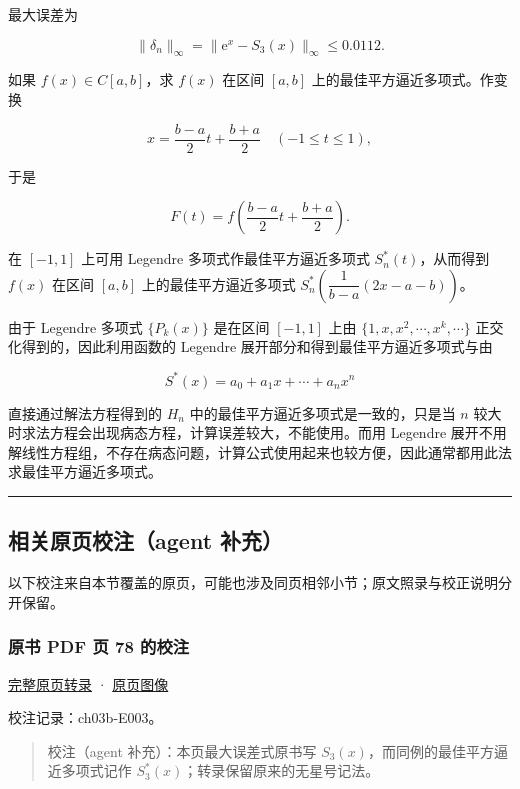 \documentclass[
  10pt,
  fontset=fandol]{ctexart}
\begin{document}
最大误差为

\[
\|\delta_n\|_\infty=\|\mathrm e^x-S_3(x)\|_\infty\leqslant0.0112.
\]

如果 \(f(x)\in C[a,b]\)，求 \(f(x)\) 在区间 \([a,b]\) 上的最佳平方逼近多项式。作变换

\[
x=\frac{b-a}{2}t+\frac{b+a}{2}\quad(-1\leqslant t\leqslant1),
\]

于是

\[
F(t)=f\left(\frac{b-a}{2}t+\frac{b+a}{2}\right).
\]

在 \([-1,1]\) 上可用 Legendre 多项式作最佳平方逼近多项式 \(S_n^*(t)\)，从而得到 \(f(x)\) 在区间 \([a,b]\) 上的最佳平方逼近多项式 \(S_n^*\left(\dfrac1{b-a}(2x-a-b)\right)\)。

由于 Legendre 多项式 \(\{P_k(x)\}\) 是在区间 \([-1,1]\) 上由 \(\{1,\allowbreak x,\allowbreak x^2,\allowbreak \cdots,\allowbreak x^k,\allowbreak \cdots\}\) 正交化得到的，因此利用函数的 Legendre 展开部分和得到最佳平方逼近多项式与由

\[
S^*(x)=a_0+a_1x+\cdots+a_nx^n
\]

直接通过解法方程得到的 \(H_n\) 中的最佳平方逼近多项式是一致的，只是当 \(n\) 较大时求法方程会出现病态方程，计算误差较大，不能使用。而用 Legendre 展开不用解线性方程组，不存在病态问题，计算公式使用起来也较方便，因此通常都用此法求最佳平方逼近多项式。

\begin{center}\rule{0.5\linewidth}{0.5pt}\end{center}

\subsection{相关原页校注（agent 补充）}\label{ux76f8ux5173ux539fux9875ux6821ux6ce8agent-ux8865ux5145}

以下校注来自本节覆盖的原页，可能也涉及同页相邻小节；原文照录与校正说明分开保留。

\subsubsection{原书 PDF 页 78 的校注}\label{ux539fux4e66-pdf-ux9875-78-ux7684ux6821ux6ce8}

\href{../pages/pdf-078.md}{完整原页转录} · \href{../../source-images/pdf-078.jpeg}{原页图像}

校注记录：ch03b-E003。

\begin{quote}
校注（agent 补充）：本页最大误差式原书写 \(S_3(x)\)，而同例的最佳平方逼近多项式记作 \(S_3^*(x)\)；转录保留原来的无星号记法。
\end{quote}
\end{document}
